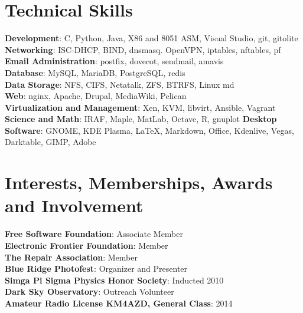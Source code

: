 \documentclass[letterpaper,11pt]{article}
\begin{document}
\section{Technical Skills}
 \begin{itemize}[leftmargin=0.15in, label={}]
    \small{\item{
     \textbf{Development}{: C, Python, Java, X86 and 8051 ASM, Visual Studio, git, gitolite} \\
     \textbf{Networking}{: ISC-DHCP, BIND, dnsmasq. OpenVPN, iptables, nftables, pf} \\
     \textbf{Email Administration}{: postfix, dovecot, sendmail, amavis} \\
     \textbf{Database}{: MySQL, MariaDB, PostgreSQL, redis} \\
     \textbf{Data Storage}{: NFS, CIFS, Netatalk, ZFS, BTRFS, Linux md} \\
     \textbf{Web}{: nginx, Apache, Drupal, MediaWiki, Pelican} \\
     \textbf{Virtualization and Management}{: Xen, KVM, libvirt, Ansible, Vagrant  } \\
     \textbf{Science and Math}{: IRAF, Maple, MatLab, Octave, R, gnuplot}
     \textbf{Desktop Software}{: GNOME, KDE Plasma, \LaTeX, Markdown, Office, Kdenlive, Vegas, Darktable, GIMP, Adobe} 
    }}
 \end{itemize}

\section{Interests, Memberships, Awards and Involvement }
\begin{itemize}[leftmargin=0.15in, label={}]
	\small{\item{
			\textbf{Free Software Foundation}{: Associate Member} \\
			\textbf{Electronic Frontier Foundation}{:  Member} \\
			\textbf{The Repair Association}{: Member} \\
			\textbf{Blue Ridge Photofest}{: Organizer and Presenter} \\
			\textbf{Simga Pi Sigma Physics Honor Society}{: Inducted 2010} \\
         	\textbf{Dark Sky Observatory}{: Outreach Volunteer} \\
         	\textbf{Amateur Radio License KM4AZD, General Class}{: 2014} \\
	}}
\end{itemize}


%


\end{document}
